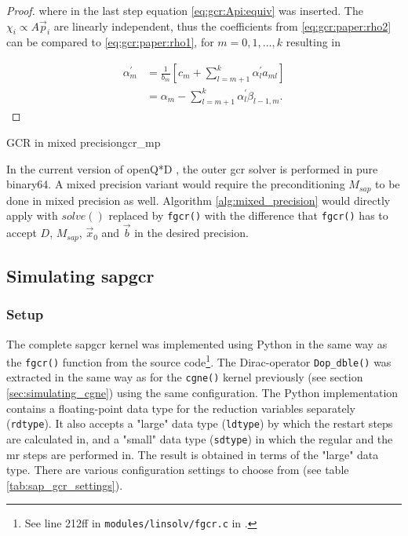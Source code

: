 \documentclass{article}
\theoremstyle{plain} %
\theoremstyle{convention} %
\theoremstyle{remark} %
\def\code#1{\texttt{#1}}
\numberwithin{equation}{section}
\begin{document}
\begin{proof}
where in the last step equation \eqref{eq:gcr:Api:equiv} was inserted. The $\chi_i \propto A \vec{p}_i$ are linearly independent, thus the coefficients from \eqref{eq:gcr:paper:rho2} can be compared to \eqref{eq:gcr:paper:rho1}, for $m=0, 1, \dots, k$ resulting in

\begin{align*}
    \alpha^{\prime}_m &= \frac{1}{b_m} \left[ c_m + \sum_{l=m+1}^k \alpha^{\prime}_l a_{ml} \right] \\
    &= \alpha_m - \sum_{l=m+1}^k \alpha^{\prime}_l \beta_{l-1,m}.
\end{align*} 

\end{proof}

\begin{proposal}{GCR in mixed precision}{gcr_mp}

In the current version of openQ*D \cite{openqxd}, the outer \acrshort{gcr} solver is performed in pure \gls{binary64}. A mixed precision variant would require the preconditioning $M_{sap}$ to be done in mixed precision as well. Algorithm \ref{alg:mixed_precision} would directly apply with $solve()$ replaced by \code{fgcr()} with the difference that \code{fgcr()} has to accept $D$, $M_{sap}$, $\vec{x}_0$ and $\vec{b}$ in the desired precision.

\end{proposal}

\subsection{Simulating \acrshort*{sapgcr}}

\label{sec:sap_gcr_results}

\subsubsection{Setup}

The complete \acrshort{sapgcr} kernel was implemented using Python in the same way as the \code{fgcr()} function from the source code\footnote{See line 212ff in \code{modules/linsolv/fgcr.c} in \cite{openqxd}.}. The Dirac-operator \code{Dop\_dble()} was extracted in the same way as for the \code{cgne()} kernel previously (see section \ref{sec:simulating_cgne}) using the same configuration. The Python implementation contains a floating-point data type for the reduction variables separately (\code{rdtype}). It also accepts a "large" data type (\code{ldtype}) by which the restart steps are calculated in, and a "small" data type (\code{sdtype}) in which the regular and the \acrshort{mr} steps are performed in. The result is obtained in terms of the "large" data type. There are various configuration settings to choose from (see table \ref{tab:sap_gcr_settings}).
\end{document}
